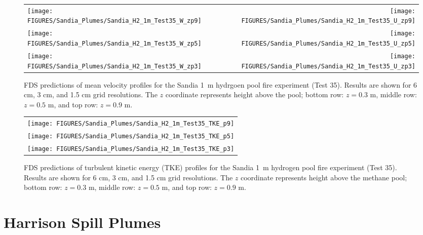 \begin{figure}[p]
\begin{tabular*}{\textwidth}{l@{\extracolsep{\fill}}r}
\texttt{[image: FIGURES/Sandia\_Plumes/Sandia\_H2\_1m\_Test35\_W\_zp9]} &
\texttt{[image: FIGURES/Sandia\_Plumes/Sandia\_H2\_1m\_Test35\_U\_zp9]} \\
\texttt{[image: FIGURES/Sandia\_Plumes/Sandia\_H2\_1m\_Test35\_W\_zp5]} &
\texttt{[image: FIGURES/Sandia\_Plumes/Sandia\_H2\_1m\_Test35\_U\_zp5]} \\
\texttt{[image: FIGURES/Sandia\_Plumes/Sandia\_H2\_1m\_Test35\_W\_zp3]} &
\texttt{[image: FIGURES/Sandia\_Plumes/Sandia\_H2\_1m\_Test35\_U\_zp3]}
\end{tabular*}
\caption[Sandia 1~m hydrogen pool fire (Test 35) mean velocity profiles.]
{FDS predictions of mean velocity profiles for the Sandia 1~m hydrgoen pool fire experiment (Test 35). Results are shown for 6 cm, 3 cm, and 1.5 cm grid resolutions. The $z$ coordinate represents height above the pool; bottom row: $z=0.3$ m, middle row: $z=0.5$ m, and top row: $z=0.9$ m.}
\label{Sandia_H2_1m_Test35_velocity}
\end{figure}

\begin{figure}[p]
\begin{center}
\begin{tabular}{c}
\texttt{[image: FIGURES/Sandia\_Plumes/Sandia\_H2\_1m\_Test35\_TKE\_p9]} \\
\texttt{[image: FIGURES/Sandia\_Plumes/Sandia\_H2\_1m\_Test35\_TKE\_p5]} \\
\texttt{[image: FIGURES/Sandia\_Plumes/Sandia\_H2\_1m\_Test35\_TKE\_p3]}
\end{tabular}
\caption[Sandia 1~m hydrogen pool fire (Test 25) turbulent kinetic energy.]
{FDS predictions of turbulent kinetic energy (TKE) profiles for the Sandia 1~m hydrogen pool fire experiment (Test 35). Results are shown for 6 cm, 3 cm, and 1.5 cm grid resolutions. The $z$ coordinate represents height above the methane pool; bottom row: $z=0.3$ m, middle row: $z=0.5$ m, and top row: $z=0.9$ m.}
\label{Sandia_H2_1m_Test35_tke}
\end{center}
\end{figure}

\clearpage

\section{Harrison Spill Plumes}
\label{Harrison_Spill_Plumes}

